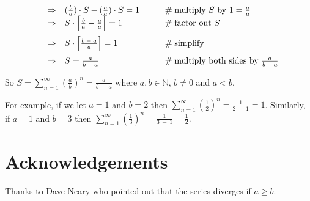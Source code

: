 \documentclass[11pt, oneside]{article}   	%
\begin{document}
\begin{equation*}
\begin{array}{lllll}
&\Rightarrow&  (\frac{b}{a}) \cdot S - (\frac{a}{a}) \cdot S = 1                                                                                     &\qquad  \mathrel{\#} \text{multiply $S$ by $1 = \frac{a}{a}$}          \\
\vspace{2.0mm}
&\Rightarrow&  S \cdot \Big [\frac{b}{a}  - \frac{a}{a} \Big ] = 1                                                                                   &\qquad  \mathrel{\#} \text{factor out $S$}                                       \\
\vspace{2.0mm}
&\Rightarrow& S \cdot \Big [ \frac{b \:-\: a} {a} \Big ]= 1                                                                                              &\qquad  \mathrel{\#} \text{simplify}                                                 \\ 
&\Rightarrow& S  = \frac{a}{b \:-\: a}                                                                                                                           &\qquad  \mathrel{\#} \text{multiply both sides by $ \frac{a}{b \:-\: a} $}
\end{array}
\end{equation*}

\bigskip
\noindent
So $S = \sum\limits_{n = 1}^\infty (\frac{a}{b})^n  =  \frac{a}{b \:-\: a}$ where $a,b \in \mathbb{N}$, $b \neq 0$ and $a < b$.  

\bigskip
\noindent
For example, if we  let $a =1$ and $b =2$ then $\sum\limits_{n = 1}^\infty (\frac{1}{2})^n  =  \frac{1}{2 \:-\: 1} = 1$. Similarly, if $a =1$ and $b = 3$ then 
$\sum\limits_{n = 1}^\infty (\frac{1}{3})^n  =  \frac{1}{3 \:-\: 1} = \frac{1}{2}$. 

\bigskip
\noindent
\section*{Acknowledgements}

Thanks to Dave Neary who pointed out that the series diverges if $a \geq b$.
\end{document}

